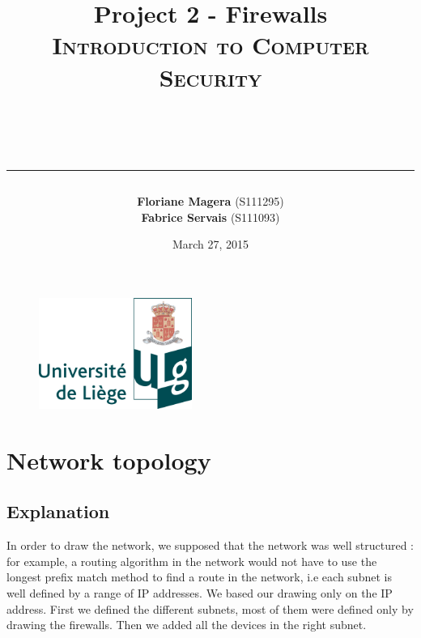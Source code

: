 \documentclass[a4paper,titlepage]{article}
\begin{document}
\begin{titlepage}

\begin{figure}
\centering
\includegraphics[width=5cm]{logo-ulg.png}
\end{figure}



\title{
\vspace{0.2cm}
\LARGE{\textbf{Project 2 - Firewalls}} \\ \textsc{Introduction to Computer Security}
\author{\textbf{Floriane Magera} \small{(S111295})\\\textbf{Fabrice Servais} \small{(S111093})}\\
\date{March 27, 2015}
\rule{15cm}{1.5pt}
}

\end{titlepage}

\pagestyle{fancy}

\maketitle


\section{Network topology}
\subsection{Explanation}
In order to draw the network, we supposed that the network was well structured : for example, a routing algorithm in the network would not have to use the longest prefix match method to find a route in the network, i.e each subnet is well defined by a range of IP addresses. We based our drawing only on the IP address. First we defined the different subnets, most of them were defined only by drawing the firewalls. Then we added all the devices in the right subnet. \\ \\
\end{document}
